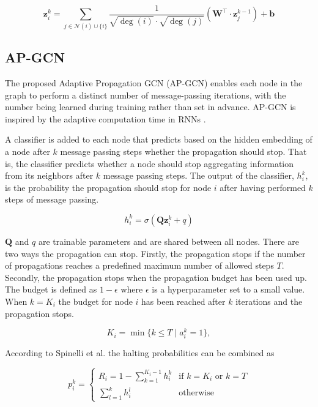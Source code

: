 \documentclass{gdl}
\begin{document}
$$
\mathbf{z}_i^{k} = \sum_{j \in \mathcal{N}(i) \cup \{i\}} \frac{1}{\sqrt{\deg(i)} \cdot \sqrt{\deg(j)}} \left( \mathbf{W}^\top \cdot \mathbf{z}_j^{k-1} \right) + \mathbf{b}
$$

\subsection{AP-GCN}
The proposed Adaptive Propagation GCN (AP-GCN) enables each node in the graph to perform a distinct number of message-passing iterations, with the number being learned during training rather than set in advance. AP-GCN is inspired by the adaptive computation time in RNNs \cite{graves2017}.

A classifier is added to each node that predicts based on the hidden embedding of a node after $k$ message passing steps whether the propagation should stop. That is, the classifier predicts whether a node should stop aggregating information from its neighbors after $k$ message passing steps. The output of the classifier, $h^k_i$, is the probability the propagation should stop for node $i$ after having performed $k$ steps of message passing.

$$h^k_i = \sigma(\textbf{Q}\textbf{z}^k_i + q)$$

\noindent $\textbf{Q}$ and $q$ are trainable parameters and are shared between all nodes. There are two ways the propagation can stop. Firstly, the propagation stops if the number of propagations reaches a predefined maximum number of allowed steps $T$. Secondly, the propagation stops when the propagation budget has been used up. The budget is defined as $1-\epsilon$ where $\epsilon$ is a hyperparameter set to a small value. When $k=K_i$ the budget for node $i$ has been reached after $k$ iterations and the propagation stops. 

\begin{equation}
K_i = \min\{ k \le T \mid a_i^k = 1 \},
\end{equation}

\noindent According to Spinelli et al. the halting probabilities can be combined as

\begin{equation}
    p_i^k = 
    \begin{cases}
    R_i = 1 - \sum_{k=1}^{K_i - 1} h_i^k & \text{if } k = K_i \text{ or } k = T \\
    \sum_{l=1}^{k} h_i^l & \text{otherwise}
    \end{cases}
    \label{eq:p}
\end{equation}
\end{document}
